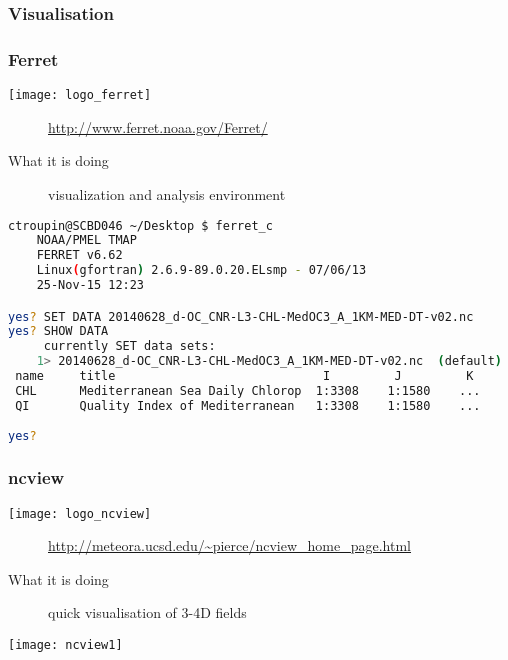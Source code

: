 \subsubsection{Visualisation}
\begin{frame}[c, fragile]
\frametitle{Ferret}

\texttt{[image: logo\_ferret]}

\begin{description}
\item[\homepage] {\scriptsize \url{http://www.ferret.noaa.gov/Ferret/}}
\item[What it is doing] visualization and analysis environment
\end{description}

\vfill

\begin{lstlisting}[language=bash,basicstyle=\tiny,title={Ferret to get basic info on file}]
ctroupin@SCBD046 ~/Desktop $ ferret_c 
 	NOAA/PMEL TMAP
 	FERRET v6.62  
 	Linux(gfortran) 2.6.9-89.0.20.ELsmp - 07/06/13
 	25-Nov-15 12:23     

yes? SET DATA 20140628_d-OC_CNR-L3-CHL-MedOC3_A_1KM-MED-DT-v02.nc 
yes? SHOW DATA
     currently SET data sets:
    1> 20140628_d-OC_CNR-L3-CHL-MedOC3_A_1KM-MED-DT-v02.nc  (default)
 name     title                             I         J         K         L
 CHL      Mediterranean Sea Daily Chlorop  1:3308    1:1580    ...       1:1
 QI       Quality Index of Mediterranean   1:3308    1:1580    ...       1:1
 
yes? 
\end{lstlisting}


\end{frame}

\begin{frame}[c]
\frametitle{ncview}

\texttt{[image: logo\_ncview]}

\begin{description}
\item[\homepage] {\scriptsize \url{http://meteora.ucsd.edu/~pierce/ncview_home_page.html}}
\item[What it is doing] quick visualisation of 3-4D fields
\end{description}

\vfill

\texttt{[image: ncview1]}

\end{frame}

